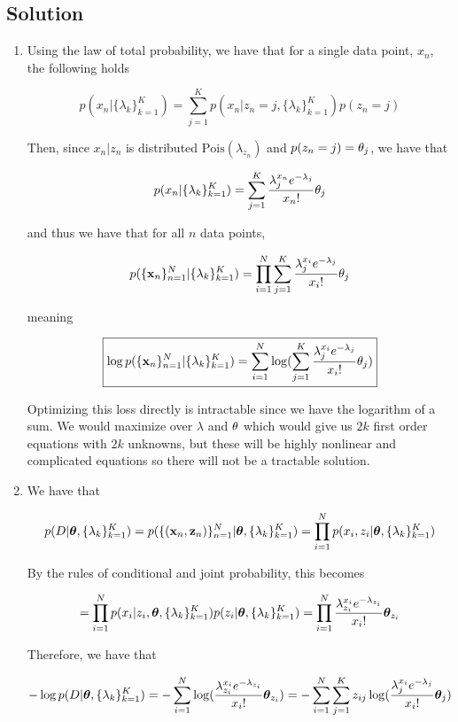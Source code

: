 \documentclass[submit]{harvardml}
\begin{document}
\subsection*{Solution}

\begin{enumerate}

\item Using the law of total probability, we have that for a single data point, $x_n$, the following holds

$$p(x_n|\{\lambda_k\}^K_{k = 1}) =\sum_{j=1}^K p(x_n| z_n = j,\{\lambda_k\}^K_{k = 1}) p(z_n = j)$$

Then, since $x_n|z_n$ is distributed $\textrm{Pois}(\lambda_{z_n})$ and $p(z_n = j) = \bold\theta_j$, we have that

$$p(x_n|\{\lambda_k\}^K_{k = 1}) =\sum_{j=1}^K \frac{\lambda_j^{x_n}e^{-\lambda_j}}{x_n!} \bold\theta_j$$

and thus we have that for all $n$ data points,

$$ p(\{\mathbf{x}_n\}^N_{n=1}|\{\lambda_k\}^K_{k = 1}) = \prod_{i=1}^N \sum_{j=1}^K \frac{\lambda_j^{x_i}e^{-\lambda_j}}{x_i!} \bold\theta_j $$

meaning

$$ \boxed{ \log p(\{\mathbf{x}_n\}^N_{n=1}|\{\lambda_k\}^K_{k = 1}) = \sum_{i=1}^N \log(\sum_{j=1}^K \frac{\lambda_j^{x_i}e^{-\lambda_j}}{x_i!} \bold\theta_j) }$$

Optimizing this loss directly is intractable since we have the logarithm of a sum. We would maximize over $\lambda$ and $\bold\theta$ which would give us $2k$ first order equations with $2k$ unknowns, but these will be highly nonlinear and complicated equations so there will not be a tractable solution.

\item We have that 

$$ p(D | \boldsymbol{\theta}, \{\lambda_k\}^K_{k=1}) = p(\{(\mathbf{x}_n, \mathbf{z}_n)\}_{n=1}^N | \boldsymbol{\theta}, \{\lambda_k\}^K_{k=1}) = \prod_{i=1}^N p(x_i, z_i | \boldsymbol{\theta}, \{\lambda_k\}^K_{k=1}) $$

By the rules of conditional and joint probability, this becomes 

$$ = \prod_{i=1}^N p(x_i | z_i, \boldsymbol{\theta}, \{\lambda_k\}^K_{k=1}) p(z_i |\boldsymbol{\theta}, \{\lambda_k\}^K_{k=1}) = \prod_{i=1}^N \frac{\lambda_{z_i}^{x_i} e^{-\lambda_{z_i}}}{x_i!} \boldsymbol{\theta}_{z_i}$$

Therefore, we have that 

$$ -\log p(D | \boldsymbol{\theta}, \{\lambda_k\}^K_{k=1})  = -\sum_{i=1}^N \log(\frac{\lambda_{z_i}^{x_i} e^{-\lambda_{z_i}}}{x_i!} \boldsymbol{\theta}_{z_i} ) = - \sum_{i=1}^N \sum_{j=1}^K z_{ij} \log(\frac{\lambda_{j}^{x_i} e^{-\lambda_{j}}}{x_i!} \boldsymbol{\theta}_{j} )$$


\end{enumerate}
\end{document}
